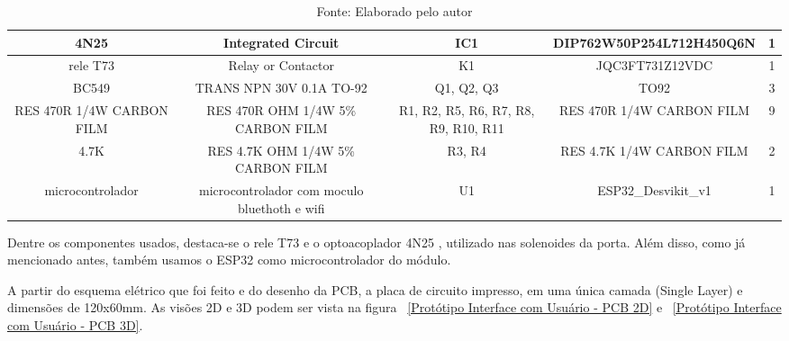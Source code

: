 \documentclass[../delivery_hospital_report.tex]{subfiles}
\begin{document}
\begin{table}[!ht]
\begin{adjustbox}{width=\columnwidth,center}
\begin{tabular}{|c|c|c|c|c|}
4N25                        & Integrated Circuit                             & IC1                                    & DIP762W50P254L712H450Q6N    & 1        \\ \hline
rele T73                    & Relay or Contactor                             & K1                                     & JQC3FT731Z12VDC             & 1        \\ \hline
BC549                       & TRANS NPN 30V 0.1A   TO-92                     & Q1, Q2, Q3                             & TO92                        & 3        \\ \hline
RES 470R 1/4W   CARBON FILM & RES 470R OHM 1/4W 5\%   CARBON FILM            & R1, R2, R5, R6, R7,   R8, R9, R10, R11 & RES 470R 1/4W CARBON   FILM & 9        \\ \hline
4.7K                        & RES 4.7K OHM 1/4W 5\%   CARBON FILM            & R3, R4                                 & RES 4.7K 1/4W CARBON   FILM & 2        \\ \hline
microcontrolador            & microcontrolador com   moculo bluethoth e wifi & U1                                     & ESP32\_Desvikit\_v1         & 1        \\ \hline

\end{tabular}
\end{adjustbox}
\centering
\caption*{Fonte: Elaborado pelo autor}
\label{table:Componentes Utilizados na placa de Interface com Usuário - Protótipo}
\end{table}

Dentre os componentes usados, destaca-se o rele T73 \cite{rele_T73_datasheet} e o optoacoplador 4N25 \cite{4N25_datasheet} , utilizado nas solenoides da porta. Além disso, como já mencionado antes, também usamos o ESP32 \cite{esp32} como microcontrolador do módulo.

A partir do esquema elétrico que foi feito e do desenho da PCB, a placa de circuito impresso, em uma única camada (Single Layer) e dimensões de 120x60mm. As visões 2D e 3D podem ser vista na figura ~\ref{Protótipo Interface com Usuário - PCB 2D} e ~\ref{Protótipo Interface com Usuário - PCB 3D}.
\end{document}
